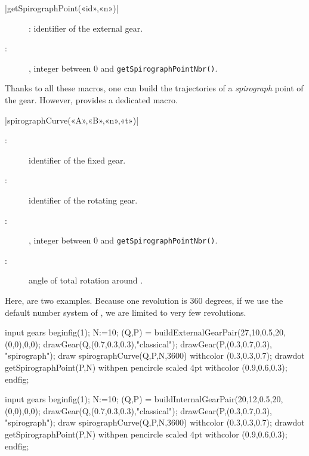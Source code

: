 \documentclass[english]{ltxdoc}
\begin{document}
\begin{colourband}
\commande|getSpirographPoint(«id»,«n»)|\smallskip{}
\begin{description}
  \item[]:  identifier of the external gear.
  \item[:] , integer between 0 and \lstinline+getSpirographPointNbr(+\lstinline+)+.  
\end{description}
\end{colourband}

Thanks to all these macros, one can build the trajectories of a
\emph{spirograph} point of the gear. However, \mpgears provides a dedicated
macro. 

\begin{colourband}
\commande|spirographCurve(«A»,«B»,«n»,«t»)|\smallskip{}
\begin{description}
  \item[:]  identifier of the fixed gear.
  \item[:]   identifier of the rotating gear.
  \item[:] , integer between 0 and \lstinline+getSpirographPointNbr(+\lstinline+)+.  
  \item[:]  angle of total rotation around .
\end{description}
\end{colourband}

Here, are two examples. Because one revolution is 360 degrees, if we use
the default number system of , we are limited to very few
revolutions. 

\begin{ExempleMP}
input gears
beginfig(1);
  N:=10;
  (Q,P) = buildExternalGearPair(27,10,0.5,20,(0,0),0,0);
  drawGear(Q,(0.7,0.3,0.3),"classical");
  drawGear(P,(0.3,0.7,0.3), "spirograph");
  draw spirographCurve(Q,P,N,3600) withcolor (0.3,0.3,0.7);
  drawdot getSpirographPoint(P,N) withpen pencircle scaled 4pt withcolor (0.9,0.6,0.3);
endfig;
\end{ExempleMP}

\begin{ExempleMP}
input gears
beginfig(1);
  N:=10;
  (Q,P) = buildInternalGearPair(20,12,0.5,20,(0,0),0,0);
  drawGear(Q,(0.7,0.3,0.3),"classical");
  drawGear(P,(0.3,0.7,0.3), "spirograph");
  draw spirographCurve(Q,P,N,3600) withcolor (0.3,0.3,0.7);
  drawdot getSpirographPoint(P,N) withpen pencircle scaled 4pt withcolor (0.9,0.6,0.3);
endfig;
\end{ExempleMP}
\end{document}
